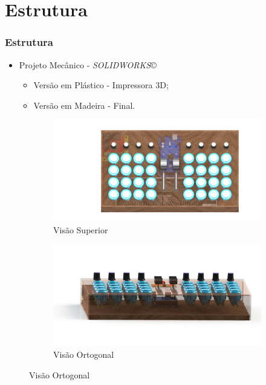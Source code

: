 \documentclass[hyperref={pdfpagelabels=false}]{beamer}
\begin{document}
        \section{Estrutura}

            \begin{frame}\frametitle{Estrutura}

                \begin{itemize}
                  \item Projeto Mecânico - \textit{SOLIDWORKS}\copyright
                    \begin{itemize}
                      \item Versão em Plástico - Impressora 3D;
                      \item Versão em Madeira - Final.
                    \end{itemize}
                \end{itemize}

                \begin{figure}[H]
                    \centering
                    \begin{subfigure}[b]{.45\textwidth}
                        \centering
                        \includegraphics[scale=0.34]{Imagens/SW_Images/Involucro-de-Madeira/madeira10001.png}
                    	\caption[Visão Superior]{Visão Superior}
                        \label{fig:shield-midi}
                    \end{subfigure} %
                    \begin{subfigure}[b]{.45\textwidth}
                        \centering
                        \includegraphics[scale=0.34]{Imagens/SW_Images/Involucro-de-Madeira/madeira5.png}
                    	\caption[Visão Ortogonal]{Visão Ortogonal}
                    	\label{fig:linear-pot}
                    \end{subfigure}


\end{figure}
\end{frame}
\end{document}
